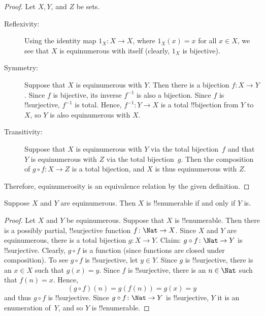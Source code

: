 \documentclass[../../include/open-logic-section]{subfiles}
\begin{document}
\begin{proof} Let $X, Y$, and $Z$ be sets.

\begin{description}

\item[Reflexivity:] Using the identity map $1_X \colon X \rightarrow
  X$, where $1_X (x) = x$ for all $x \in X$, we see
  that $X$ is equinumerous with itself (clearly, $1_X$ is bijective).

\item[Symmetry:] Suppose that $X$ is equinumerous with $Y$. Then there
  is a bijection $f\colon X \rightarrow Y$. Since $f$ is bijective,
  its inverse $f^{-1}$ is also a bijection. Since $f$ is !!{surjective},
  $f^{-1}$ is total. Hence, $f^{-1}\colon Y \rightarrow X$ is a total
  !!{bijection} from $Y$ to~$X$, so $Y$ is also equinumerous with $X$.

\item[Transitivity:] Suppose that $X$ is equinumerous with $Y$ via the
  total bijection~$f$ and that $Y$ is equinumerous with $Z$ via the
  total bijection~$g$. Then the composition of $g \circ f \colon X
  \rightarrow Z$ is a total bijection, and $X$ is thus equinumerous
  with $Z$.
\end{description}
Therefore, equinumerosity is an equivalence relation by the given definition.
\end{proof}

\begin{thm}
Suppose $X$ and $Y$ are equinumerous. Then $X$ is !!{enumerable} if
and only if $Y$ is.
\end{thm}

\begin{proof}
Let $X$ and $Y$ be equinumerous.  Suppose that $X$ is
!!{enumerable}. Then there is a possibly partial, !!{surjective}
function $f\colon \Nat \to X$. Since $X$ and $Y$ are equinumerous,
there is a total bijection $g\colon X \to Y$. Claim: $g \circ f \colon
\Nat \rightarrow Y$ is !!{surjective}. Clearly, $g \circ f$ is a
function (since functions are closed under composition). To see $g
\circ f$ is !!{surjective}, let $y \in Y$. Since $g$ is
!!{surjective}, there is an $x \in X$ such that $g(x) = y$. Since $f$
is !!{surjective}, there is an $n \in \Nat$ such that $f(n) =
x$. Hence,
\[ 
(g \circ f)(n) = g(f(n)) = g(x) = y 
\]
and thus $g \circ f$ is !!{surjective}. Since $g \circ f\colon \Nat
\to Y$ is !!{surjective}, $Y$ it is an enumeration of~$Y$, and so $Y$ is
!!{enumerable}.
\end{proof}
\end{document}

